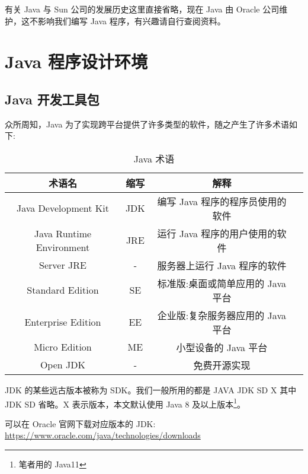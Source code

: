 有关 Java 与 Sun 公司的发展历史这里直接省略，现在 Java 由 Oracle 公司维护，这不影响我们编写 Java 程序，有兴趣请自行查阅资料。

\section{Java 程序设计环境}
\subsection{Java 开发工具包}

众所周知，Java 为了实现跨平台提供了许多类型的软件，随之产生了许多术语如下:

\begin{table}[H]
    \centering
    \caption{Java 术语}
    \label{table:Java 术语}
    \setlength{\tabcolsep}{4mm}
    \begin{tabular}{c|c|cc}
        \toprule
        \textbf{术语名} & \textbf{缩写} & \textbf{解释} \\
        \midrule
        Java Development Kit & JDK & 编写 Java 程序的程序员使用的软件 \\
        Java Runtime Environment & JRE & 运行 Java 程序的用户使用的软件 \\
        Server JRE & - & 服务器上运行 Java 程序的软件 \\
        Standard Edition & SE & 标准版:桌面或简单应用的 Java 平台 \\
        Enterprise Edition & EE & 企业版:复杂服务器应用的 Java 平台 \\
        Micro Edition & ME & 小型设备的 Java 平台 \\
        Open JDK & - & 免费开源实现 \\
        \bottomrule
    \end{tabular}
\end{table}

JDK 的某些远古版本被称为 SDK。我们一般所用的都是 JAVA JDK SD X 其中 JDK SD 省略。X 表示版本，本文默认使用 Java 8 及以上版本\footnote{笔者用的 Java11}。

可以在 Oracle 官网下载对应版本的 JDK: \url{https://www.oracle.com/java/technologies/downloads}

\newpage